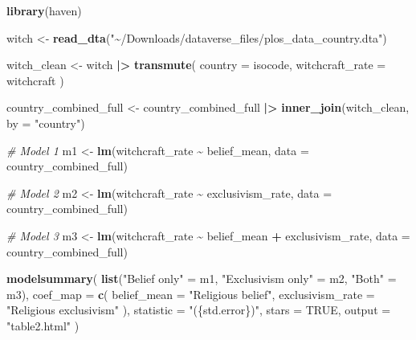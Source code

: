 \documentclass[
]{article}
\newenvironment{Shaded}{\begin{snugshade}}{\end{snugshade}}
\newcommand{\AttributeTok}[1]{\textcolor[rgb]{0.13,0.29,0.53}{#1}}
\newcommand{\CommentTok}[1]{\textcolor[rgb]{0.56,0.35,0.01}{\textit{#1}}}
\newcommand{\ConstantTok}[1]{\textcolor[rgb]{0.56,0.35,0.01}{#1}}
\newcommand{\FunctionTok}[1]{\textcolor[rgb]{0.13,0.29,0.53}{\textbf{#1}}}
\newcommand{\NormalTok}[1]{#1}
\newcommand{\OtherTok}[1]{\textcolor[rgb]{0.56,0.35,0.01}{#1}}
\newcommand{\SpecialCharTok}[1]{\textcolor[rgb]{0.81,0.36,0.00}{\textbf{#1}}}
\newcommand{\StringTok}[1]{\textcolor[rgb]{0.31,0.60,0.02}{#1}}
\begin{document}
\begin{Shaded}
\begin{Highlighting}[]
\FunctionTok{library}\NormalTok{(haven)}

\NormalTok{witch }\OtherTok{\textless{}{-}} \FunctionTok{read\_dta}\NormalTok{(}\StringTok{"\textasciitilde{}/Downloads/dataverse\_files/plos\_data\_country.dta"}\NormalTok{)}


\NormalTok{witch\_clean }\OtherTok{\textless{}{-}}\NormalTok{ witch }\SpecialCharTok{|\textgreater{}}
  \FunctionTok{transmute}\NormalTok{(}
    \AttributeTok{country =}\NormalTok{ isocode,}
    \AttributeTok{witchcraft\_rate =}\NormalTok{ witchcraft}
\NormalTok{  )}

\NormalTok{country\_combined\_full }\OtherTok{\textless{}{-}}\NormalTok{ country\_combined\_full }\SpecialCharTok{|\textgreater{}}
  \FunctionTok{inner\_join}\NormalTok{(witch\_clean, }\AttributeTok{by =} \StringTok{"country"}\NormalTok{)}

\CommentTok{\# Model 1}
\NormalTok{m1 }\OtherTok{\textless{}{-}} \FunctionTok{lm}\NormalTok{(witchcraft\_rate }\SpecialCharTok{\textasciitilde{}}\NormalTok{ belief\_mean, }\AttributeTok{data =}\NormalTok{ country\_combined\_full)}

\CommentTok{\# Model 2}
\NormalTok{m2 }\OtherTok{\textless{}{-}} \FunctionTok{lm}\NormalTok{(witchcraft\_rate }\SpecialCharTok{\textasciitilde{}}\NormalTok{ exclusivism\_rate, }\AttributeTok{data =}\NormalTok{ country\_combined\_full)}

\CommentTok{\# Model 3}
\NormalTok{m3 }\OtherTok{\textless{}{-}} \FunctionTok{lm}\NormalTok{(witchcraft\_rate }\SpecialCharTok{\textasciitilde{}}\NormalTok{ belief\_mean }\SpecialCharTok{+}\NormalTok{ exclusivism\_rate,}
         \AttributeTok{data =}\NormalTok{ country\_combined\_full)}

\FunctionTok{modelsummary}\NormalTok{(}
  \FunctionTok{list}\NormalTok{(}\StringTok{"Belief only"} \OtherTok{=}\NormalTok{ m1,}
       \StringTok{"Exclusivism only"} \OtherTok{=}\NormalTok{ m2,}
       \StringTok{"Both"} \OtherTok{=}\NormalTok{ m3),}
  \AttributeTok{coef\_map =} \FunctionTok{c}\NormalTok{(}
    \AttributeTok{belief\_mean =} \StringTok{"Religious belief"}\NormalTok{,}
    \AttributeTok{exclusivism\_rate =} \StringTok{"Religious exclusivism"}
\NormalTok{  ),}
  \AttributeTok{statistic =} \StringTok{"(\{std.error\})"}\NormalTok{,}
  \AttributeTok{stars =} \ConstantTok{TRUE}\NormalTok{,}
  \AttributeTok{output =} \StringTok{"table2.html"}
\NormalTok{)}
\end{Highlighting}
\end{Shaded}
\end{document}
